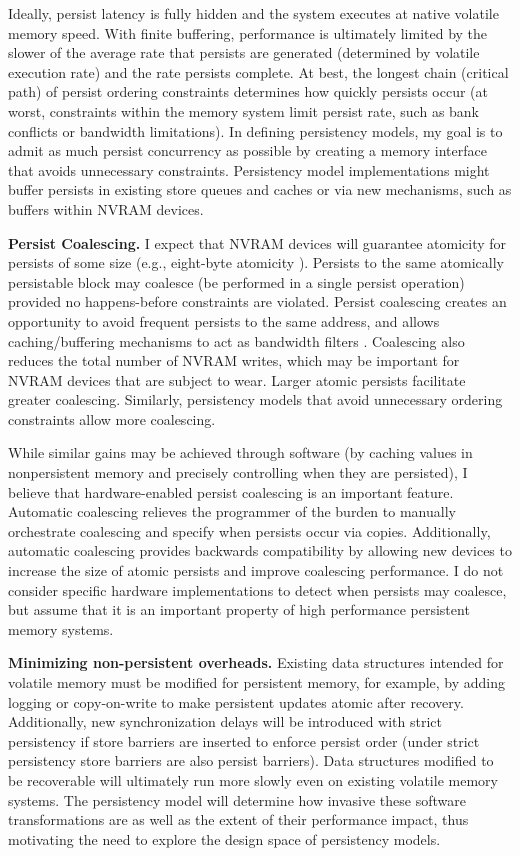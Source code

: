 Ideally, persist latency is fully hidden and the system executes at native volatile memory speed.
With finite buffering, performance is ultimately limited by the slower of the average rate that persists are generated (determined by volatile execution rate) and the rate persists complete.
At best, the longest chain (critical path) of persist ordering constraints determines how quickly persists occur (at worst, constraints within the memory system limit persist rate, such as bank conflicts or bandwidth limitations).
In defining persistency models, my goal is to admit as much persist concurrency as possible by creating a memory interface that avoids unnecessary constraints.
Persistency model implementations might buffer persists in existing store queues and caches or via new mechanisms, such as buffers within NVRAM devices.

\textbf{Persist Coalescing.}
I expect that NVRAM devices will guarantee atomicity for persists of some size (e.g., eight-byte atomicity \cite{Condit09}).
Persists to the same atomically persistable block may coalesce (be performed in a single persist operation) provided no happens-before constraints are violated. 
Persist coalescing creates an opportunity to avoid frequent persists to the same address, and allows caching/buffering mechanisms to act as bandwidth filters \cite{Goodman83}.
Coalescing also reduces the total number of NVRAM writes, which may be important for NVRAM devices that are subject to wear.
Larger atomic persists facilitate greater coalescing.
Similarly, persistency models that avoid unnecessary ordering constraints allow more coalescing. 

While similar gains may be achieved through software (by caching values in nonpersistent memory and precisely controlling when they are persisted), I believe that hardware-enabled persist coalescing is an important feature.
Automatic coalescing relieves the programmer of the burden to manually orchestrate coalescing and specify when persists occur via copies.
Additionally, automatic coalescing provides backwards compatibility by allowing new devices to increase the size of atomic persists and improve coalescing performance.
I do not consider specific hardware implementations to detect when persists may coalesce, but assume that it is an important property of high performance persistent memory systems.

\textbf{Minimizing non-persistent overheads.}
Existing data structures intended for volatile memory must be modified for persistent memory, for example, by adding logging or copy-on-write to make persistent updates atomic after recovery.
Additionally, new synchronization delays will be introduced with strict persistency if store barriers are inserted to enforce persist order (under strict persistency store barriers are also persist barriers).
Data structures modified to be recoverable will ultimately run more slowly even on existing volatile memory systems.
The persistency model will determine how invasive these software transformations are as well as the extent of their performance impact, thus motivating the need to explore the design space of persistency models.

